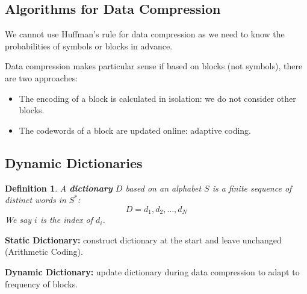 \documentclass[11pt]{article}
\newtheorem{defn}{Definition}
\begin{document}
\subsection{Algorithms for Data Compression}
We cannot use Huffman's rule for data compression as we need to know the probabilities of symbols or blocks in advance.

Data compression makes particular sense if based on blocks (not symbols), there are two approaches:
\begin{itemize}
  \item The encoding of a block is calculated in isolation: we do not consider other blocks.
  \item The codewords of a block are updated online: adaptive coding.
\end{itemize}

\subsection{Dynamic Dictionaries}
\begin{defn}
  A \textbf{dictionary} $D$ based on an alphabet $S$ is a finite sequence of distinct words in $S^*$:
  \[
    D = d_1, d_2, \ldots, d_N
  \]
  We say $i$ is the index of $d_i$.
\end{defn}

\textbf{Static Dictionary:} construct dictionary at the start and leave unchanged (Arithmetic Coding).

\textbf{Dynamic Dictionary:} update dictionary during data compression to adapt to frequency of blocks.
\end{document}
